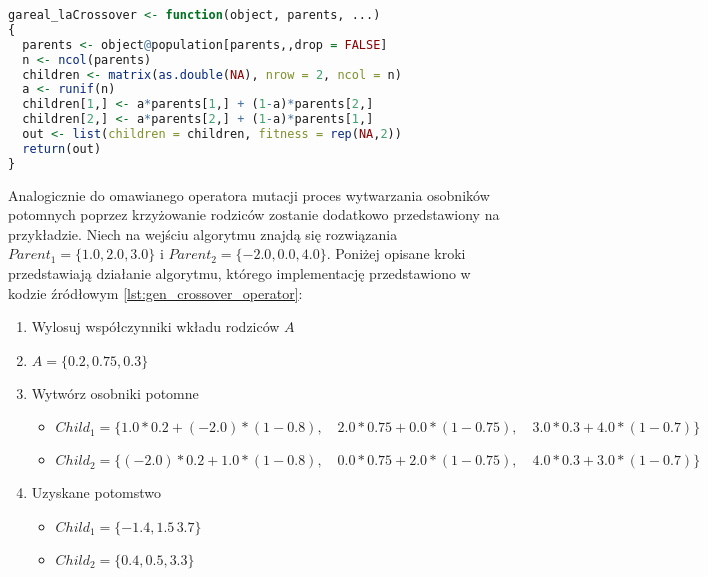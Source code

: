 \begin{lstlisting}[caption=Zastosowany operator krzyżowania z pakietu \emph{GA} dla języka \emph{R}, label=lst:gen_crossover_operator, mathescape, breaklines=true, language=R]
gareal_laCrossover <- function(object, parents, ...)
{
  parents <- object@population[parents,,drop = FALSE]
  n <- ncol(parents)
  children <- matrix(as.double(NA), nrow = 2, ncol = n)
  a <- runif(n)
  children[1,] <- a*parents[1,] + (1-a)*parents[2,]
  children[2,] <- a*parents[2,] + (1-a)*parents[1,]
  out <- list(children = children, fitness = rep(NA,2))
  return(out)
}
\end{lstlisting}
Analogicznie do omawianego operatora mutacji proces wytwarzania osobników potomnych poprzez krzyżowanie rodziców zostanie dodatkowo przedstawiony na przykładzie. Niech na wejściu algorytmu znajdą się rozwiązania $Parent_1 = \lbrace1.0, 2.0, 3.0\rbrace$ i $Parent_2 = \lbrace-2.0, 0.0, 4.0\rbrace$. Poniżej opisane kroki przedstawiają działanie algorytmu, którego implementację przedstawiono w kodzie źródłowym \ref{lst:gen_crossover_operator}:
\begin{enumerate}
\item Wylosuj współczynniki wkładu rodziców $A$
\item $A=\lbrace0.2, 0.75, 0.3\rbrace$
\item Wytwórz osobniki potomne
\begin{itemize}
\item $Child_1 = \lbrace1.0*0.2+(-2.0)*(1-0.8),\quad 2.0*0.75+0.0*(1-0.75),\quad 3.0*0.3+4.0*(1-0.7)\rbrace$
\item $Child_2 = \lbrace(-2.0)*0.2+1.0*(1-0.8),\quad 0.0*0.75+2.0*(1-0.75),\quad 4.0*0.3+3.0*(1-0.7)\rbrace$
\end{itemize}
\item Uzyskane potomstwo
\begin{itemize}
\item $Child_1 = \lbrace-1.4,1.5\, 3.7\rbrace$
\item $Child_2 = \lbrace0.4, 0.5, 3.3\rbrace$
\end{itemize}
\end{enumerate}

